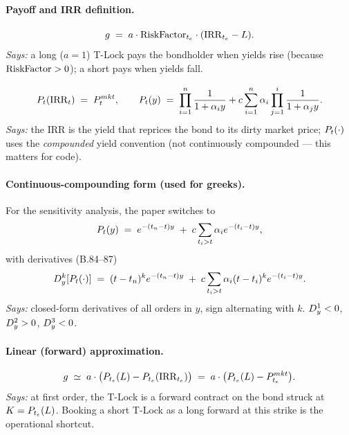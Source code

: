 \documentclass[11pt,a4paper]{article}
\begin{document}
\paragraph{Payoff and IRR definition.}
\begin{equation}\label{eq:payoff}
  g \;=\; a \cdot \mathrm{RiskFactor}_{t_e} \cdot (\mathrm{IRR}_{t_e} - L).
\end{equation}
\textit{Says:} a long ($a=1$) T-Lock pays the bondholder when yields
rise (because $\mathrm{RiskFactor}>0$); a short pays when yields fall.

\begin{equation}\label{eq:irr-def}
  P_{t}(\mathrm{IRR}_t) \;=\; P_t^{mkt}, \qquad
  P_{t}(y) \;=\; \prod_{i=1}^n \frac{1}{1+\alpha_i y}
   + c \sum_{i=1}^n \alpha_i \prod_{j=1}^i \frac{1}{1+\alpha_j y}.
\end{equation}
\textit{Says:} the IRR is the yield that reprices the bond to its
dirty market price; $P_{t}(\cdot)$ uses the \emph{compounded} yield
convention (not continuously compounded --- this matters for code).

\paragraph{Continuous-compounding form (used for greeks).}
For the sensitivity analysis, the paper switches to
\begin{equation}\label{eq:bond-cc}
  P_{t}(y) \;=\; e^{-(t_n - t)y} \;+\; c \sum_{t_i > t} \alpha_i e^{-(t_i-t)y},
\end{equation}
with derivatives (B.84--87)
\begin{equation}\label{eq:bond-derivs}
  D_{y}^{k}[P_{t}(\cdot)] \;=\; (t - t_n)^k e^{-(t_n - t)y}
                             \;+\; c \sum_{t_i > t} \alpha_i (t-t_i)^k e^{-(t_i-t)y}.
\end{equation}
\textit{Says:} closed-form derivatives of all orders in $y$, sign
alternating with $k$. $D_{y}^{1}<0$, $D_{y}^{2}>0$, $D_{y}^{3}<0$.

\paragraph{Linear (forward) approximation.}
\begin{equation}\label{eq:linear-approx}
  g \;\simeq\; a \cdot \bigl(P_{t_e}(L) - P_{t_e}(\mathrm{IRR}_{t_e})\bigr)
       \;=\; a \cdot \bigl(P_{t_e}(L) - P_{t_e}^{mkt}\bigr).
\end{equation}
\textit{Says:} at first order, the T-Lock is a forward contract on the
bond struck at $K = P_{t_e}(L)$. Booking a short T-Lock
as a long forward at this strike is the operational shortcut.
\end{document}
